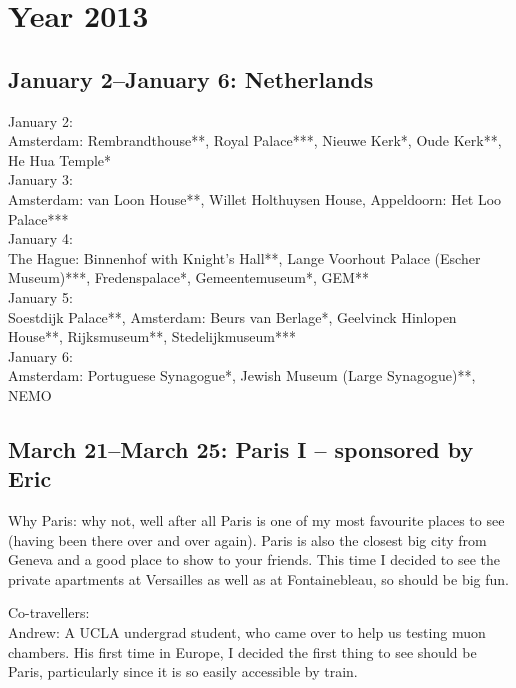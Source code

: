 \chapter{Year 2013}
\label{2013}

\section{January 2--January 6: Netherlands}
\label{2013:Netherlands}

January 2:\\
Amsterdam: Rembrandthouse**, Royal Palace***, Nieuwe Kerk*, Oude Kerk**, He Hua Temple*\\

January 3:\\
Amsterdam: van Loon House**, Willet Holthuysen House, Appeldoorn: Het Loo Palace***\\

January 4:\\
The Hague: Binnenhof with Knight's Hall**, Lange Voorhout Palace (Escher Museum)***, Fredenspalace*, Gemeentemuseum*, GEM**\\

January 5:\\
Soestdijk Palace**, Amsterdam: Beurs van Berlage*, Geelvinck Hinlopen House**, Rijksmuseum**, Stedelijkmuseum***\\

January 6:\\
Amsterdam: Portuguese Synagogue*, Jewish Museum (Large Synagogue)**, NEMO

\section{March 21--March 25: Paris I -- sponsored by Eric}
\label{2013:ParisI}

Why Paris: why not, well after all Paris is one of my most favourite places to see (having been there over and over again). Paris is also the closest big city from Geneva and a good place to show to your friends. This time I decided to see the private apartments at Versailles as well as at Fontainebleau, so should be big fun. 

Co-travellers:\\
Andrew: A UCLA undergrad student, who came over to help us testing muon chambers. His first time in Europe, I decided the first thing to see should be Paris, particularly since it is so easily accessible by train.\\

